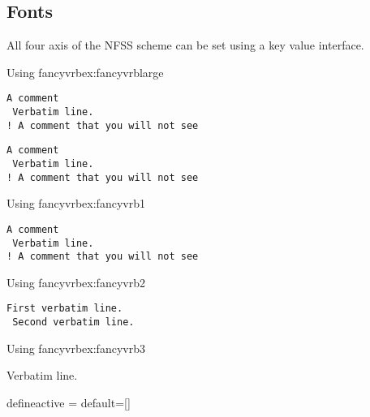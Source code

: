  \subsection{Fonts}

All four axis of the NFSS scheme can be set using a key value interface.

\begin{texexample}{Using fancyvrb}{ex:fancyvrblarge}
\begin{Verbatim}[commentchar=!,gobble=0,fontfamily=tt]
 A comment
 Verbatim line.
! A comment that you will not see
\end{Verbatim}

\begin{Verbatim}[commentchar=!,gobble=0,fontfamily=tt]
 A comment
 Verbatim line.
! A comment that you will not see
\end{Verbatim}
\end{texexample}



\begin{texexample}{Using fancyvrb}{ex:fancyvrb1}
\begin{Verbatim}[commentchar=!,gobble=0]
 A comment
 Verbatim line.
! A comment that you will not see
\end{Verbatim}
\end{texexample}


\begin{texexample}{Using fancyvrb}{ex:fancyvrb2}
 \begin{Verbatim}[frame=single,
 label=My text]
 First verbatim line.
 Second verbatim line.
 \end{Verbatim}
\end{texexample}

\begin{texexample}{Using fancyvrb}{ex:fancyvrb3}
  \begin{Verbatim*}
   Verbatim line.
  \end{Verbatim*}
\end{texexample}

\begin{docKey}{defineactive}{ = }{default=[]}
 
\end{docKey}

